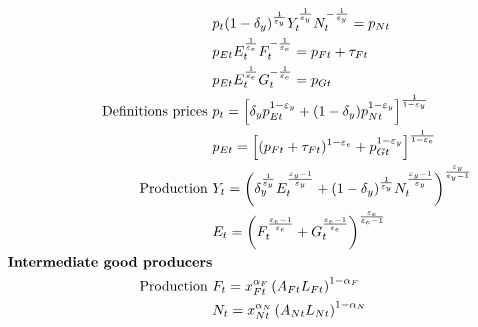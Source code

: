\begin{align}
& p_{t}(1-\delta_y)^\frac{1}{\varepsilon_y}Y_t^\frac{1}{\varepsilon_y}N_t^{-\frac{1}{\varepsilon_y}}=p_{Nt}\nonumber\\
&
p_{Et}E_t^\frac{1}{\varepsilon_e}{F}_t^{-\frac{1}{\varepsilon_e}}=p_{{F}t}+\tau_{Ft}\nonumber\\
& p_{Et}E_t^\frac{1}{\varepsilon_e}G_t^{-\frac{1}{\varepsilon_e}}=p_{Gt}\nonumber\\
\text{Definitions prices}\ \vspace{4mm}&
p_{t}= \left[\delta_yp_{Et}^{1-\varepsilon_y}+(1-\delta_y)p_{Nt}^{1-\varepsilon_y}\right]^\frac{1}{1-\varepsilon_y}\nonumber\\
& p_{Et}= \left[(p_{{F}t}+\tau_{Ft})^{1-\varepsilon_e}+p_{Gt}^{1-\varepsilon_y}\right]^\frac{1}{1-\varepsilon_e}\nonumber\\
\text{Production}\ \vspace{4mm}& 
Y_t=\left(\delta_y^\frac{1}{\varepsilon_y}E_t^\frac{\varepsilon_y-1}{\varepsilon_y}+(1-\delta_y)^\frac{1}{\varepsilon_y}N_t^\frac{\varepsilon_y-1}{\varepsilon_y}\right)^\frac{\varepsilon_y}{\varepsilon_y-1}\label{mod:y}\\
&E_t=\left({F}_t^\frac{\varepsilon_e-1}{\varepsilon_e}+G_t^\frac{\varepsilon_e-1}{\varepsilon_e}\right)^\frac{\varepsilon_e}{\varepsilon_e-1}\label{mod:E}\\
\text{\textbf{Intermediate good producers}}&\nonumber\\
\text{Production}\ \vspace{4mm}& F_t= x_{Ft}^{\alpha_F}\left(A_{Ft}L_{Ft}\right)^{1-\alpha_F}%
\label{mod:F}\\
&N_t= x_{Nt}^{\alpha_N}\left(A_{Nt}L_{Nt}\right)^{1-\alpha_N}%
\label{mod:N}\\

\end{align}
